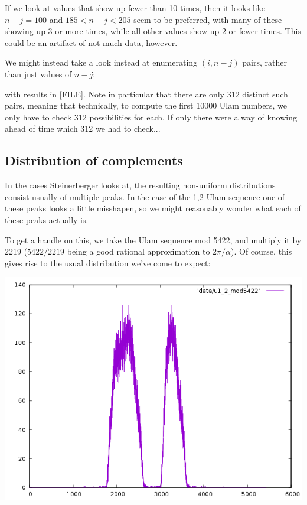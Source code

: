 \documentclass{article}
\theoremstyle{definition}
\theoremstyle{remark}
\numberwithin{equation}{section}
\begin{document}
If we look at values that show up fewer than 10 times, then it looks
like $n-j = 100$ and $185 < n-j < 205$ seem to be preferred, with many
of these showing up 3 or more times, while all other values show up 2
or fewer times.  This could be an artifact of not much data, however.

We might instead take a look instead at enumerating $(i,n-j)$ pairs,
rather than just values of $n-j$:


with results in [FILE].  Note in particular that there are
only 312 distinct such pairs, meaning that technically, to compute the
first 10000 Ulam numbers, we only have to check 312 possibilities for
each.  If only there were a way of knowing ahead of time which 312 we
had to check...


\subsection{Distribution of complements}


In the cases Steinerberger looks at, the resulting non-uniform
distributions consist usually of multiple peaks.  In the case of the
1,2 Ulam sequence one of these peaks looks a little misshapen, so we
might reasonably wonder what each of these peaks actually is.

To get a handle on this, we take the Ulam sequence mod 5422, and
multiply it by 2219 ($5422/2219$ being a good rational approximation
to $2\pi/\alpha$).  Of course, this gives rise to the usual
distribution we've come to expect:

\includegraphics[scale=0.5]{../figs/u1_2_mod5422.png}
\end{document}
